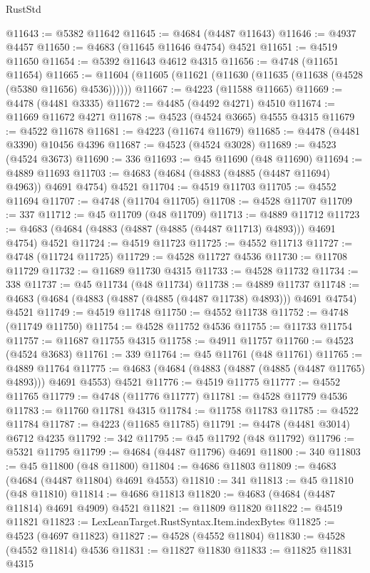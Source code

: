 \begin{lexlean}{RustStd}
\begin{coremodule}
@11643 := @5382 @11642
@11645 := @4684 (@4487 @11643)
@11646 := @4937 @4457
@11650 := @4683 (@11645 @11646 @4754) @4521
@11651 := @4519 @11650
@11654 := @5392 @11643 @4612 @4315
@11656 := @4748 (@11651 @11654)
@11665 := @11604 (@11605 (@11621 (@11630 (@11635 (@11638 (@4528 (@5380 @11656) @4536))))))
@11667 := @4223 (@11588 @11665)
@11669 := @4478 (@4481 @3335)
@11672 := @4485 (@4492 @4271) @4510
@11674 := @11669 @11672 @4271
@11678 := @4523 (@4524 @3665) @4555 @4315
@11679 := @4522 @11678
@11681 := @4223 (@11674 @11679)
@11685 := @4478 (@4481 @3390) @10456 @4396
@11687 := @4523 (@4524 @3028)
@11689 := @4523 (@4524 @3673)
@11690 := 336
@11693 := @45 @11690 (@48 @11690)
@11694 := @4889 @11693
@11703 := @4683 (@4684 (@4883 (@4885 (@4487 @11694) @4963)) @4691 @4754) @4521
@11704 := @4519 @11703
@11705 := @4552 @11694
@11707 := @4748 (@11704 @11705)
@11708 := @4528 @11707
@11709 := 337
@11712 := @45 @11709 (@48 @11709)
@11713 := @4889 @11712
@11723 := @4683 (@4684 (@4883 (@4887 (@4885 (@4487 @11713) @4893))) @4691 @4754) @4521
@11724 := @4519 @11723
@11725 := @4552 @11713
@11727 := @4748 (@11724 @11725)
@11729 := @4528 @11727 @4536
@11730 := @11708 @11729
@11732 := @11689 @11730 @4315
@11733 := @4528 @11732
@11734 := 338
@11737 := @45 @11734 (@48 @11734)
@11738 := @4889 @11737
@11748 := @4683 (@4684 (@4883 (@4887 (@4885 (@4487 @11738) @4893))) @4691 @4754) @4521
@11749 := @4519 @11748
@11750 := @4552 @11738
@11752 := @4748 (@11749 @11750)
@11754 := @4528 @11752 @4536
@11755 := @11733 @11754
@11757 := @11687 @11755 @4315
@11758 := @4911 @11757
@11760 := @4523 (@4524 @3683)
@11761 := 339
@11764 := @45 @11761 (@48 @11761)
@11765 := @4889 @11764
@11775 := @4683 (@4684 (@4883 (@4887 (@4885 (@4487 @11765) @4893))) @4691 @4553) @4521
@11776 := @4519 @11775
@11777 := @4552 @11765
@11779 := @4748 (@11776 @11777)
@11781 := @4528 @11779 @4536
@11783 := @11760 @11781 @4315
@11784 := @11758 @11783
@11785 := @4522 @11784
@11787 := @4223 (@11685 @11785)
@11791 := @4478 (@4481 @3014) @6712 @4235
@11792 := 342
@11795 := @45 @11792 (@48 @11792)
@11796 := @5321 @11795
@11799 := @4684 (@4487 @11796) @4691
@11800 := 340
@11803 := @45 @11800 (@48 @11800)
@11804 := @4686 @11803
@11809 := @4683 (@4684 (@4487 @11804) @4691 @4553)
@11810 := 341
@11813 := @45 @11810 (@48 @11810)
@11814 := @4686 @11813
@11820 := @4683 (@4684 (@4487 @11814) @4691 @4909) @4521
@11821 := @11809 @11820
@11822 := @4519 @11821
@11823 := LexLeanTarget.RustSyntax.Item.indexBytes
@11825 := @4523 (@4697 @11823)
@11827 := @4528 (@4552 @11804)
@11830 := @4528 (@4552 @11814) @4536
@11831 := @11827 @11830
@11833 := @11825 @11831 @4315

\end{coremodule}
\end{lexlean}
